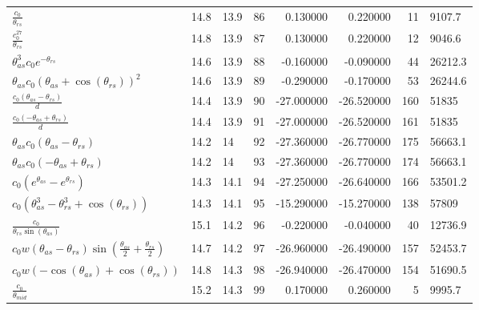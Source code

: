 \begin{tabularx}{\textwidth}{lllrrrrl}
$ \displaystyle\frac{c_{0}}{\theta_{rs}} $  &  14.8  &  13.9  &  86  &  0.130000  &  0.220000  &  11  &  9107.7  \\ 
$ \displaystyle\frac{c_{0}^{27}}{\theta_{rs}} $  &  14.8  &  13.9  &  87  &  0.130000  &  0.220000  &  12  &  9046.6  \\ 
$ \theta_{as}^{3} c_{0} e^{- \theta_{rs}} $  &  14.6  &  13.9  &  88  &  -0.160000  &  -0.090000  &  44  &  26212.3  \\ 
$ \theta_{as} c_{0} \left(\theta_{as} + \cos{\left(\theta_{rs} \right)}\right)^{2} $  &  14.6  &  13.9  &  89  &  -0.290000  &  -0.170000  &  53  &  26244.6  \\ 
$ \displaystyle\frac{c_{0} \left(\theta_{as} - \theta_{rs}\right)}{d} $  &  14.4  &  13.9  &  90  &  -27.000000  &  -26.520000  &  160  &  51835\phantom{.0}  \\ 
$ \displaystyle\frac{c_{0} \left(- \theta_{as} + \theta_{rs}\right)}{d} $  &  14.4  &  13.9  &  91  &  -27.000000  &  -26.520000  &  161  &  51835\phantom{.0}  \\ 
$ \theta_{as} c_{0} \left(\theta_{as} - \theta_{rs}\right) $  &  14.2  &  14\phantom{.0}  &  92  &  -27.360000  &  -26.770000  &  175  &  56663.1  \\ 
$ \theta_{as} c_{0} \left(- \theta_{as} + \theta_{rs}\right) $  &  14.2  &  14\phantom{.0}  &  93  &  -27.360000  &  -26.770000  &  174  &  56663.1  \\ 
$ c_{0} \left(e^{\theta_{as}} - e^{\theta_{rs}}\right) $  &  14.3  &  14.1  &  94  &  -27.250000  &  -26.640000  &  166  &  53501.2  \\ 
$ c_{0} \left(\theta_{as}^{3} - \theta_{rs}^{3} + \cos{\left(\theta_{rs} \right)}\right) $  &  14.3  &  14.1  &  95  &  -15.290000  &  -15.270000  &  138  &  57809\phantom{.0}  \\ 
$ \displaystyle\frac{c_{0}}{\theta_{rs} \sin{\left(\theta_{as} \right)}} $  &  15.1  &  14.2  &  96  &  -0.220000  &  -0.040000  &  40  &  12736.9  \\ 
$ c_{0} w \left(\theta_{as} - \theta_{rs}\right) \sin{\left(\displaystyle\frac{\theta_{as}}{2} + \displaystyle\frac{\theta_{rs}}{2} \right)} $  &  14.7  &  14.2  &  97  &  -26.960000  &  -26.490000  &  157  &  52453.7  \\ 
$ c_{0} w \left(- \cos{\left(\theta_{as} \right)} + \cos{\left(\theta_{rs} \right)}\right) $  &  14.8  &  14.3  &  98  &  -26.940000  &  -26.470000  &  154  &  51690.5  \\ 
$ \displaystyle\frac{c_{0}}{\theta_{mid}} $  &  15.2  &  14.3  &  99  &  0.170000  &  0.260000  &  5  &  9995.7  \\ 

\end{tabularx}
